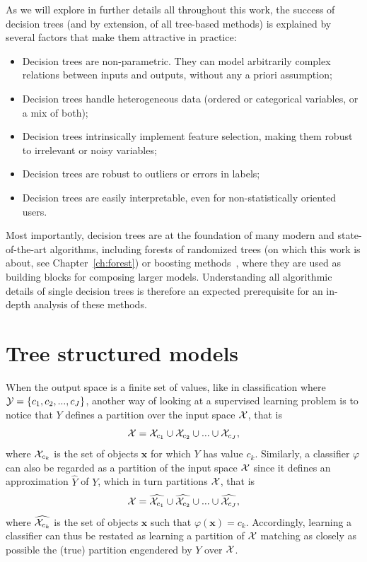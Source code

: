 As we will explore in further details all throughout this work, the success
of decision trees (and by extension, of all tree-based methods) is explained
by several factors that make them attractive in practice:
\begin{itemize}
\item Decision trees are non-parametric. They can model arbitrarily complex relations between inputs and outputs, without any a priori assumption;
\item Decision trees handle heterogeneous data (ordered or categorical variables, or a mix of both);
\item Decision trees intrinsically implement feature selection, making them robust to irrelevant or noisy variables;
\item Decision trees are robust to outliers or errors in labels;
\item Decision trees are easily interpretable, even for non-statistically oriented users.
\end{itemize}

Most importantly, decision trees are at the foundation of
many modern and state-of-the-art algorithms, including forests of randomized
trees (on which this work is about, see Chapter~\ref{ch:forest}) or
boosting methods~\citep{freund:1995,friedman:2001}, where they are used
as building blocks for composing larger models. Understanding all algorithmic
details of single decision trees is therefore an expected prerequisite
for an in-depth analysis of these methods.


\section{Tree structured models}
\label{sec:3:tree-structured-models}

When the output space is a finite set of values, like in classification where
${\cal Y} = \{c_1, c_2, ..., c_J\}$, another way of looking at a supervised
learning problem is to notice that $Y$ defines a partition over the input space ${\cal X}$, that
is
\begin{equation}
{\cal X} = {\cal X}_{c_1} \cup {\cal X}_{c_2} \cup ... \cup {\cal X}_{c_J},
\end{equation}
where ${\cal X}_{c_k}$ is the set of objects $\mathbf{x}$ for which
$Y$ has value $c_k$. Similarly, a classifier $\varphi$ can also be
regarded as a partition of the input space
${\cal X}$ since it defines an approximation $\widehat{Y}$ of $Y$, which in
turn partitions ${\cal X}$, that is
\begin{equation}\label{eqn:3:partition}
{\cal X} = \widehat{{\cal X}_{c_1}} \cup \widehat{{\cal X}_{c_2}} \cup ... \cup \widehat{{\cal X}_{c_J}},
\end{equation}
where
$\widehat{{\cal X}_{c_k}}$ is the set of objects $\mathbf{x}$ such that
$\varphi(\mathbf{x}) = c_k$. Accordingly, learning a classifier can thus
be restated as learning a partition of ${\cal X}$ matching as closely as
possible the (true) partition engendered by $Y$ over ${\cal X}$.


